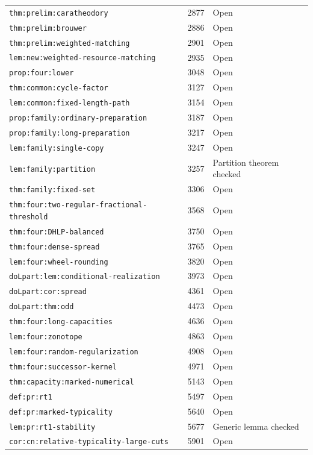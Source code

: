 \begin{longtable}{p{}r >{\raggedright\arraybackslash}p{}}
\nolinkurl{thm:prelim:caratheodory} & 2877 & Open \\
\nolinkurl{thm:prelim:brouwer} & 2886 & Open \\
\nolinkurl{thm:prelim:weighted-matching} & 2901 & Open \\
\nolinkurl{lem:new:weighted-resource-matching} & 2935 & Open \\
\nolinkurl{prop:four:lower} & 3048 & Open \\
\nolinkurl{thm:common:cycle-factor} & 3127 & Open \\
\nolinkurl{lem:common:fixed-length-path} & 3154 & Open \\
\nolinkurl{prop:family:ordinary-preparation} & 3187 & Open \\
\nolinkurl{prop:family:long-preparation} & 3217 & Open \\
\nolinkurl{lem:family:single-copy} & 3247 & Open \\
\nolinkurl{lem:family:partition} & 3257 & Partition theorem checked \\
\nolinkurl{thm:family:fixed-set} & 3306 & Open \\
\nolinkurl{thm:four:two-regular-fractional-threshold} & 3568 & Open \\
\nolinkurl{thm:four:DHLP-balanced} & 3750 & Open \\
\nolinkurl{thm:four:dense-spread} & 3765 & Open \\
\nolinkurl{lem:four:wheel-rounding} & 3820 & Open \\
\nolinkurl{doLpart:lem:conditional-realization} & 3973 & Open \\
\nolinkurl{doLpart:cor:spread} & 4361 & Open \\
\nolinkurl{doLpart:thm:odd} & 4473 & Open \\
\nolinkurl{thm:four:long-capacities} & 4636 & Open \\
\nolinkurl{lem:four:zonotope} & 4863 & Open \\
\nolinkurl{lem:four:random-regularization} & 4908 & Open \\
\nolinkurl{thm:four:successor-kernel} & 4971 & Open \\
\nolinkurl{thm:capacity:marked-numerical} & 5143 & Open \\
\nolinkurl{def:pr:rt1} & 5497 & Open \\
\nolinkurl{def:pr:marked-typicality} & 5640 & Open \\
\nolinkurl{lem:pr:rt1-stability} & 5677 & Generic lemma checked \\
\nolinkurl{cor:cn:relative-typicality-large-cuts} & 5901 & Open \\

\end{longtable}

